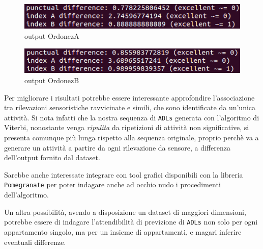 \documentclass[12pt, a4paper]{scrartcl}
\begin{document}
\begin{figure}[!ht]
	\centering
	\includegraphics[scale=0.6]{ordonezA.png} 
	\caption{output OrdonezA}
	\label{fig:ordonezA}
\end{figure}
\begin{figure}[!ht]
	\centering
	\includegraphics[scale=0.6]{ordonezB.png} 
	\caption{output OrdonezB}
	\label{fig:ordonezB}
\end{figure}

Per migliorare i risultati potrebbe essere interessante approfondire l'associazione tra rilevazioni sensoristiche ravvicinate e simili, che sono identificate da un'unica attività. Si nota infatti che la nostra sequenza di \texttt{ADLs} generata con l'algoritmo di Viterbi, nonostante venga \emph{ripulita} da ripetizioni di attività non significative, si presenta comunque più lunga rispetto alla sequenza originale, proprio perchè va a generare un attività a partire da ogni rilevazione da sensore, a differenza dell'output fornito dal dataset.

Sarebbe anche interessate integrare con tool grafici disponibili con la libreria \texttt{Pomegranate} per poter indagare anche ad occhio nudo i procedimenti dell'algoritmo.

Un altra possibilità, avendo a disposizione un dataset di maggiori dimensioni, potrebbe essere di indagare l'attendibilità di previzione di \texttt{ADLs} non solo per ogni appartamento singolo, ma per un insieme di appartamenti, e magari inferire eventuali differenze.
\end{document}
